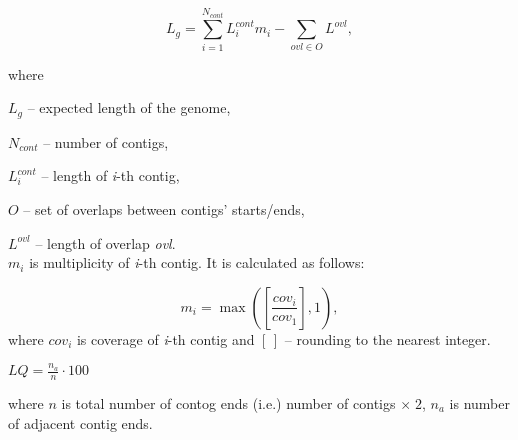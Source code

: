 \documentclass{article}
\begin{document}
	$$L_{g} = \sum_{i=1}^{N_{cont}} L_{i}^{cont} m_{i} - \sum_{ovl \in O} L^{ovl},$$
	
	where
	
	$L_{g}$ -- expected length of the genome,
	
	$N_{cont}$ -- number of contigs,
	
	$L_{i}^{cont}$ -- length of \textit{i}-th contig,
	
	$O$ -- set of overlaps between contigs' starts/ends,
	
	$L^{ovl}$ -- length of overlap \textit{ovl}.\\
	
	$m_{i}$ is multiplicity of \textit{i}-th contig. It is calculated as follows: 
	
	$$m_{i} = \max(\left[\frac{cov_{i}}{cov_{1}}\right], 1),$$  where $cov_{i}$ is coverage of \textit{i}-th contig and $\left[\,\right]$ -- rounding to the nearest integer.
	
	\newpage
	
	$LQ = \frac{n_{a}}{n} \cdot {100}$
	
where $n$ is total number of contog ends (i.e.) number of contigs $\times\;2$, $n_{a}$ is number of adjacent contig ends. 
	
	
	
\end{document}
